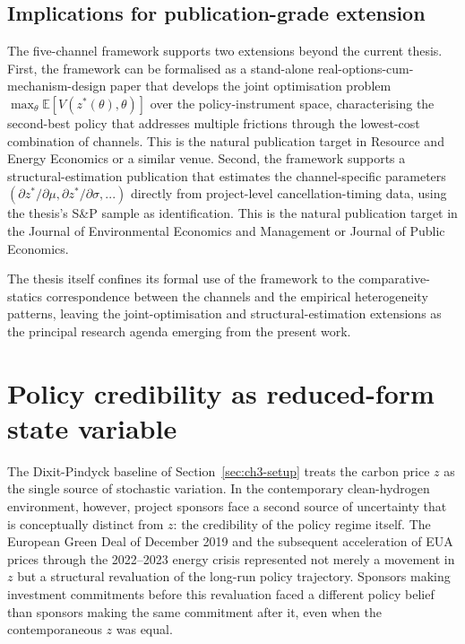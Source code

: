 \subsection{Implications for publication-grade extension}
\label{sec:ch3-channels-publication}

The five-channel framework supports two extensions beyond the current thesis. First, the framework can be formalised as a stand-alone real-options-cum-mechanism-design paper that develops the joint optimisation problem $\max_{\theta} \mathbb{E}[V(z^*(\theta), \theta)]$ over the policy-instrument space, characterising the second-best policy that addresses multiple frictions through the lowest-cost combination of channels. This is the natural publication target in Resource and Energy Economics or a similar venue. Second, the framework supports a structural-estimation publication that estimates the channel-specific parameters $(\partial z^*/\partial \mu, \partial z^*/\partial \sigma, ...)$ directly from project-level cancellation-timing data, using the thesis's S\&P sample as identification. This is the natural publication target in the Journal of Environmental Economics and Management or Journal of Public Economics.

The thesis itself confines its formal use of the framework to the comparative-statics correspondence between the channels and the empirical heterogeneity patterns, leaving the joint-optimisation and structural-estimation extensions as the principal research agenda emerging from the present work.

\section{Policy credibility as reduced-form state variable}
\label{sec:ch3-policy-credibility}

The Dixit-Pindyck baseline of Section~\ref{sec:ch3-setup} treats the carbon price $z$ as the single source of stochastic variation. In the contemporary clean-hydrogen environment, however, project sponsors face a second source of uncertainty that is conceptually distinct from $z$: the credibility of the policy regime itself. The European Green Deal of December 2019 and the subsequent acceleration of EUA prices through the 2022--2023 energy crisis represented not merely a movement in $z$ but a structural revaluation of the long-run policy trajectory. Sponsors making investment commitments before this revaluation faced a different policy belief than sponsors making the same commitment after it, even when the contemporaneous $z$ was equal.

